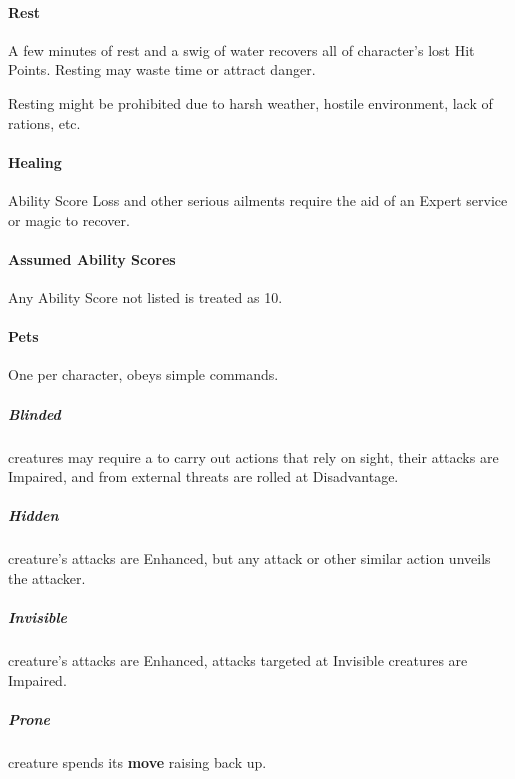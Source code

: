 \documentclass[itdr]{subfiles}
\begin{document}
\vfill
\paragraph{Rest}
A few minutes of rest and a swig of water recovers all of character's lost Hit Points. Resting may waste time or attract danger.

Resting might be prohibited due to harsh weather, hostile environment, lack of rations, etc.

\vfill
\paragraph{Healing}
Ability Score Loss and other serious ailments require the aid of an Expert service or magic to recover.

\vfill
\paragraph{Assumed Ability Scores}
Any Ability Score not listed is treated as 10.


\vfill
\paragraph{Pets}
One per character, obeys simple commands.

\vfill
{}

\subparagraph{Blinded} creatures may require a  to carry out actions that rely on sight, their attacks are Impaired, and  from external threats are rolled at Disadvantage.

\subparagraph{Hidden} creature's attacks are Enhanced, but any attack or other similar action unveils the attacker.

\subparagraph{Invisible} creature's attacks are Enhanced, attacks targeted at Invisible creatures are Impaired.

\subparagraph{Prone} creature spends its \textbf{move} raising back up.
\end{document}
